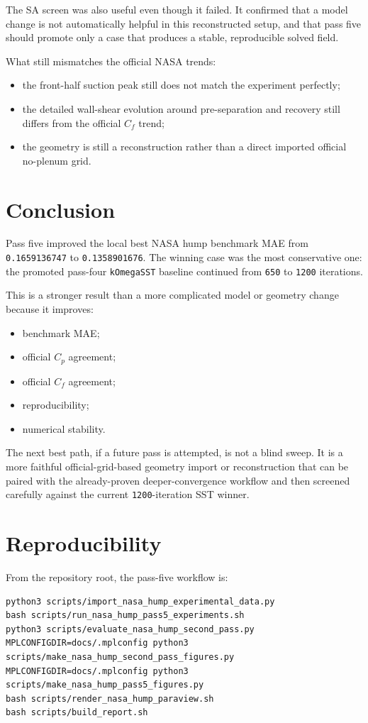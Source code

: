 \documentclass[11pt]{article}
\begin{document}
The SA screen was also useful even though it failed. It confirmed that a model change is not automatically helpful in this reconstructed setup, and that pass five should promote only a case that produces a stable, reproducible solved field.

What still mismatches the official NASA trends:
\begin{itemize}
\item the front-half suction peak still does not match the experiment perfectly;
\item the detailed wall-shear evolution around pre-separation and recovery still differs from the official \(C_f\) trend;
\item the geometry is still a reconstruction rather than a direct imported official no-plenum grid.
\end{itemize}

\section{Conclusion}
Pass five improved the local best NASA hump benchmark MAE from \texttt{0.1659136747} to \texttt{0.1358901676}. The winning case was the most conservative one: the promoted pass-four \texttt{kOmegaSST} baseline continued from \texttt{650} to \texttt{1200} iterations.

This is a stronger result than a more complicated model or geometry change because it improves:
\begin{itemize}
\item benchmark MAE;
\item official \(C_p\) agreement;
\item official \(C_f\) agreement;
\item reproducibility;
\item numerical stability.
\end{itemize}

The next best path, if a future pass is attempted, is not a blind sweep. It is a more faithful official-grid-based geometry import or reconstruction that can be paired with the already-proven deeper-convergence workflow and then screened carefully against the current \texttt{1200}-iteration SST winner.

\section{Reproducibility}
From the repository root, the pass-five workflow is:
\begin{lstlisting}
python3 scripts/import_nasa_hump_experimental_data.py
bash scripts/run_nasa_hump_pass5_experiments.sh
python3 scripts/evaluate_nasa_hump_second_pass.py
MPLCONFIGDIR=docs/.mplconfig python3 scripts/make_nasa_hump_second_pass_figures.py
MPLCONFIGDIR=docs/.mplconfig python3 scripts/make_nasa_hump_pass5_figures.py
bash scripts/render_nasa_hump_paraview.sh
bash scripts/build_report.sh
\end{lstlisting}



\end{document}

